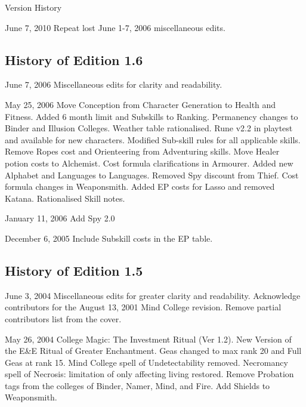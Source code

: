\begin{Chapter}{Version History}
\begin{Description}
\item[June 7, 2010] Repeat lost June 1-7, 2006 miscellaneous edits.

\end{Description}

\subsection{History of Edition 1.6}

\begin{Description}

\item[June 7, 2006] Miscellaneous edits for clarity and readability.

\item[May 25, 2006] Move Conception from Character Generation to
  Health and Fitness.  Added 6 month limit and Subskills to Ranking.
  Permanency changes to Binder and Illusion Colleges.  Weather table
  rationalised. Rune v2.2 in playtest and available for new
  characters.  Modified Sub-skill rules for all applicable skills.
  Remove Ropes cost and Orienteering from Adventuring skills. Move
  Healer potion costs to Alchemist.  Cost formula clarifications in
  Armourer.  Added new Alphabet and Languages to Languages.  Removed
  Spy discount from Thief.  Cost formula changes in Weaponsmith.
  Added EP costs for Lasso and removed Katana.  Rationalised Skill
  notes.

\item[January 11, 2006] Add Spy 2.0 

\item[December 6, 2005] Include Subskill costs in the EP table.

\end{Description}

\subsection{History of Edition 1.5}

\begin{Description}

\item[June 3, 2004] Miscellaneous edits for greater clarity and
  readability.  Acknowledge contributors for the August 13, 2001 Mind
  College revision.  Remove partial contributors list from the
  cover.

\item[May 26, 2004] College Magic: The Investment Ritual (Ver 1.2).
  New Version of the E\&E Ritual of Greater Enchantment.  Geas changed
  to max rank 20 and Full Geas at rank 15.  Mind College spell of
  Undetectability removed.  Necromancy spell of Necrosis: limitation
  of only affecting living restored. Remove Probation tags from the
  colleges of Binder, Namer, Mind, and Fire.  Add Shields to
  Weaponsmith.


\end{Description}
\end{Chapter}
